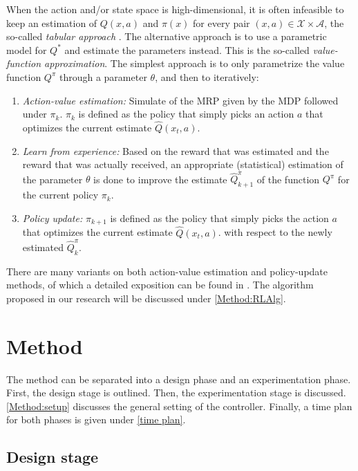 \documentclass{article}
\theoremstyle{definition}
\theoremstyle{remark}
\newcommand{\stat}{\mathcal{X}}
\newcommand{\act}{\mathcal{A}}
\begin{document}
When the action and/or state space is high-dimensional, it is often infeasible to keep an estimation of $Q(x,a)$ and $\pi(x)$ for every pair $(x,a) \in \stat\times\act$, the so-called \textit{tabular approach} \cite{suttonbarto2018, Szepesvari2010}. The alternative approach is to use a parametric model for $Q^*$ and estimate the parameters instead. This is the so-called \textit{value-function approximation}. The simplest approach is to only parametrize the value function $Q^\pi$ through a parameter $\theta$, and then to iteratively:
\begin{enumerate}
    \item \textit{Action-value estimation:} Simulate of the MRP given by the MDP followed under $\pi_k$. $\pi_k$ is defined as the policy that simply picks an action $a$ that optimizes the current estimate $\hat Q(x_t,a)$. 
    
    \item \textit{Learn from experience:} Based on the reward that was estimated and the reward that was actually received, an appropriate (statistical) estimation of the parameter $\theta$ is done to improve the estimate $\hat Q^\pi_{k+1}$ of the function $Q^\pi$ for the current policy $\pi_k$.
    
    \item \textit{Policy update:} $\pi_{k+1}$ is defined as the policy that simply picks the action $a$ that optimizes the current estimate $\hat Q(x_t,a)$. with respect to the newly estimated $\hat Q^\pi_k$.
\end{enumerate}

There are many variants on both action-value estimation and policy-update methods, of which a detailed exposition can be found in \cite{suttonbarto2018, Szepesvari2010}. The algorithm proposed in our research will be discussed under \ref{Method:RLAlg}.



\section{Method}
The method can be separated into a design phase and an experimentation phase. First, the design stage is outlined. Then, the experimentation stage is discussed. \ref{Method:setup} discusses the general setting of the controller. Finally, a time plan for both phases is given under \ref{time plan}.

\subsection{Design stage}
\end{document}
